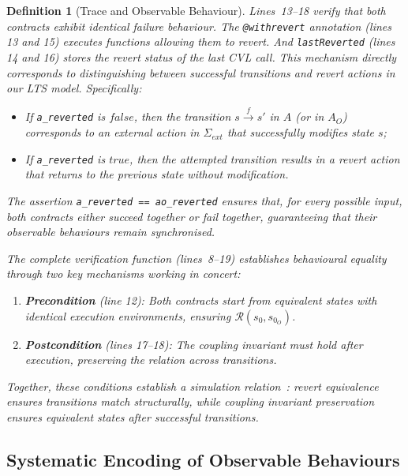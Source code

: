 \documentclass[manuscript,screen,review]{acmart}
\newenvironment{revisedblock}{\color{red}}{}
\newtheorem{definition}{Definition}
\begin{document}
\begin{definition}[Trace and Observable Behaviour]
Lines~13--18 verify that both contracts exhibit identical failure behaviour. The \texttt{@withrevert} annotation (lines 13 and 15) executes functions allowing them to revert. And \texttt{lastReverted} (lines 14 and 16) stores the revert status of the last CVL call. This mechanism directly corresponds to distinguishing between successful transitions and revert actions in our LTS model. Specifically:
\begin{itemize}
    \item If \texttt{a\_reverted} is $\mathit{false}$, then the transition $s \xrightarrow{f} s'$ in $A$ (or in $A_O$) corresponds to an external action in $\Sigma_{\textit{ext}}$ that successfully modifies state $s$;
    \item If \texttt{a\_reverted} is $\mathit{true}$, then the attempted transition results in a revert action that returns to the previous state without modification.
\end{itemize}

The assertion \texttt{a\_reverted == ao\_reverted} ensures that, for every possible input, both contracts either succeed together or fail together, guaranteeing that their observable behaviours remain synchronised.

The complete verification function (lines~8--19) establishes behavioural equality through two key mechanisms working in concert:

\begin{enumerate}
    \item \textbf{Precondition} (line 12): Both contracts start from equivalent states with identical execution environments, ensuring $\mathcal{R}(s_0, s_{0_O})$.
    \item \textbf{Postcondition} (lines 17--18): The coupling invariant must hold after execution, preserving the relation across transitions.
\end{enumerate}

Together, these conditions establish a simulation relation~\cite{milner1989communication}: revert equivalence ensures transitions match structurally, while coupling invariant preservation ensures equivalent states after successful transitions.

\begin{revisedblock}
\subsection{Systematic Encoding of Observable Behaviours}
\label{sec:observable_encoding}


\end{revisedblock}
\end{definition}
\end{document}
